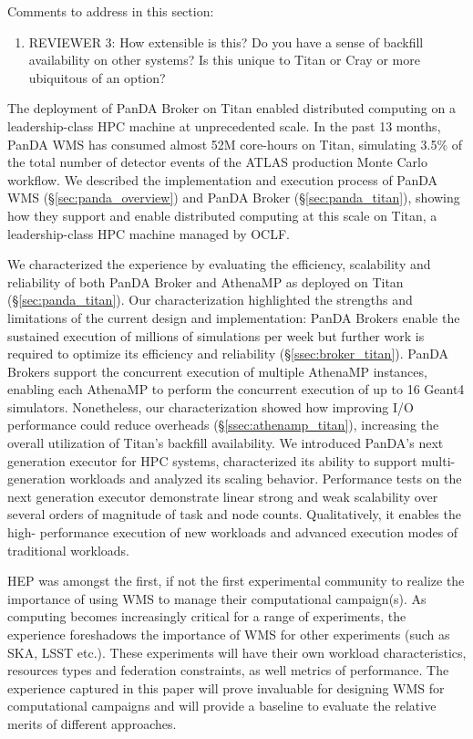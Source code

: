 \ifreview
Comments to address in this section:
\begin{enumerate}
	\item REVIEWER 3: How extensible is this? Do you have a sense of backfill
	availability on other systems? Is this unique to Titan or Cray or more
	ubiquitous of an option?
\end{enumerate}
\fi

The deployment of PanDA Broker on Titan enabled distributed computing on a
leadership-class HPC machine at unprecedented scale. In the past 13 months,
PanDA WMS has consumed almost 52M core-hours on Titan, simulating 3.5\% of
the total number of detector events of the ATLAS production Monte Carlo
workflow. We described the implementation and execution process of PanDA WMS
(\S\ref{sec:panda_overview}) and PanDA Broker (\S\ref{sec:panda_titan}),
showing how they support and enable distributed computing at this scale on
Titan, a leadership-class HPC machine managed by OCLF.

We characterized the experience by evaluating the efficiency, scalability and
reliability of both PanDA Broker and AthenaMP as deployed on Titan
(\S\ref{sec:panda_titan}). Our characterization highlighted the strengths and
limitations of the current design and implementation: PanDA Brokers enable the
sustained execution of millions of simulations per week but further work is
required to optimize its efficiency and reliability
(\S\ref{ssec:broker_titan}). PanDA Brokers support the concurrent execution of
multiple AthenaMP instances, enabling each AthenaMP to perform the concurrent
execution of up to 16 Geant4 simulators. Nonetheless, our characterization
showed how improving I/O performance could reduce overheads
(\S\ref{ssec:athenamp_titan}), increasing the overall utilization of Titan's
backfill availability. We introduced PanDA's next generation executor for HPC
systems, characterized its ability to support multi-generation workloads and
analyzed its scaling behavior.  Performance tests on the next generation
executor demonstrate linear strong and weak scalability over several orders
of magnitude  of task and node counts.  Qualitatively, it enables the high-
performance execution of new workloads and advanced execution modes of
traditional workloads.


HEP was amongst the first, if not the first experimental community to realize
the importance of using WMS to manage their computational campaign(s). As
computing becomes increasingly critical for a range of experiments, the
experience foreshadows the importance of WMS for other experiments (such as
SKA, LSST etc.).  These experiments will have their own workload
characteristics, resources types and federation constraints, as well metrics
of performance. The experience captured in this paper will prove invaluable
for designing WMS for computational campaigns and will provide a baseline to
evaluate the relative merits of different approaches.

